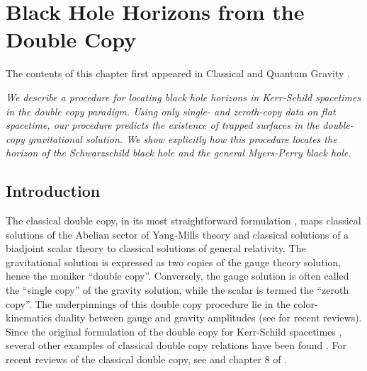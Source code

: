 \chapter{Black Hole Horizons from the Double Copy} \label{chap:Horizons}

The contents of this chapter first appeared in Classical and Quantum Gravity \cite{Chawla:2023bsu}.

\textit{We describe a procedure for locating black hole horizons in Kerr-Schild
spacetimes in the double copy paradigm. Using only single- and zeroth-copy data on
flat spacetime, our procedure predicts the existence of trapped surfaces in the double-
copy gravitational solution. We show explicitly how this procedure locates the horizon
of the Schwarzschild black hole and the general Myers-Perry black hole.}

\section{Introduction} \label{Horizons:sec:intro} 

The classical double copy, in its most straightforward formulation \cite{Monteiro:2014cda}, maps classical
solutions of the Abelian sector of Yang-Mills theory and classical solutions of a biadjoint scalar
theory to classical solutions of general relativity. The gravitational solution is expressed as two copies of the
gauge theory solution, hence the moniker ``double copy''. Conversely, the gauge solution is often called the
``single copy'' of the gravity solution, while the scalar is termed the ``zeroth copy''. The underpinnings of this
double copy procedure lie in the color-kinematics duality between gauge and gravity amplitudes (see
\cite{Travaglini:2022uwo,Bern:2019prr,Adamo:2022dcm} for recent reviews). Since the original formulation of the
double copy for Kerr-Schild spacetimes \cite{Monteiro:2014cda}, several other examples of classical double copy
relations have been found
\cite{Luna:2015paa,Luna:2017dtq,Ridgway:2015fdl,Adamo:2017nia,Bahjat-Abbas:2017htu,CarrilloGonzalez:2018ejf,Ilderton:2018lsf,Gurses:2018ckx,Carrillo-Gonzalez:2017iyj,Lee:2018gxc,Lescano:2020nve,Lescano:2021ooe,Bah:2019sda,Goldberger:2019xef,Kim:2019jwm,Luna:2020adi,Easson:2020esh,Berman:2018hwd,Alkac:2021seh,Mkrtchyan:2022ulc,Adamo:2022rob,Alfonsi:2020lub,Adamo:2020qru,Gonzo:2021drq,Luna:2018dpt,Keeler:2020rcv,Easson:2021asd,Easson:2022zoh,Godazgar:2020zbv,White:2020sfn,Chacon:2021wbr,Chacon:2021lox,Han:2022mze,Alawadhi:2020jrv,Godazgar:2021iae,Armstrong-Williams:2023ssz}.
For recent reviews of the classical double copy, see \cite{Kosower:2022yvp} and chapter 8 of \cite{Bern:2019prr}.

